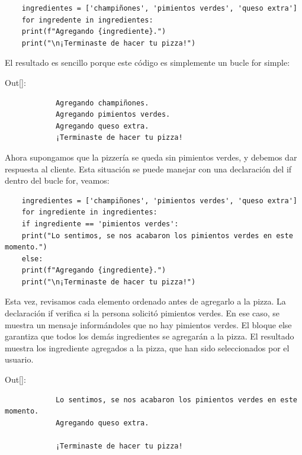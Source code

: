 \hspace{-2.5cm}{\ttfamily \scriptsize toppings.py}\vspace{-0.52cm}
\begin{lstlisting}		
	ingredientes = ['champiñones', 'pimientos verdes', 'queso extra']	
	for ingredente in ingredientes:
	print(f"Agregando {ingrediente}.")
	print("\n¡Terminaste de hacer tu pizza!")	
\end{lstlisting}	

El resultado es sencillo porque este código es simplemente un bucle {\ttfamily for} simple:\vspace{0.09cm}


{\ttfamily\scriptsize\noindent Out[]:\vspace{-0.292cm}	
	{\color{blue} 	 	
		\begin{verbatim}
			Agregando champiñones.
			Agregando pimientos verdes.
			Agregando queso extra.
			¡Terminaste de hacer tu pizza!		
		\end{verbatim}
}}

Ahora supongamos que la pizzería se queda sin pimientos verdes, y debemos dar respuesta al cliente. Esta situación se puede manejar con una declaración del {\ttfamily if} dentro del bucle {\ttfamily for}, veamos:


\hspace{-2.5cm}{\ttfamily \scriptsize toppings.py}  \vspace{-0.5cm}
\begin{lstlisting}		
	ingredientes = ['champiñones', 'pimientos verdes', 'queso extra']	
	for ingrediente in ingredientes:
	if ingrediente == 'pimientos verdes':   
	print("Lo sentimos, se nos acabaron los pimientos verdes en este momento.")
	else:
	print(f"Agregando {ingrediente}.")
	print("\n¡Terminaste de hacer tu pizza!")	
\end{lstlisting}	

Esta vez, revisamos cada elemento ordenado antes de agregarlo a la pizza. La declaración  {\ttfamily if} verifica si la persona solicitó pimientos verdes. En ese caso,  se  muestra un mensaje informándoles que no hay pimientos verdes.  El bloque {\ttfamily else} garantiza que todos los demás ingredientes se agregarán a la pizza.  El resultado muestra los ingrediente agregados a la pizza, que han sido seleccionados por el usuario.\vspace{0.09cm}


{\ttfamily\scriptsize\noindent Out[]:\vspace{-0.292cm}	
	{\color{blue} 		
		\begin{verbatim}
			Lo sentimos, se nos acabaron los pimientos verdes en este momento.
			Agregando queso extra.
			
			¡Terminaste de hacer tu pizza!			
		\end{verbatim}
}}


